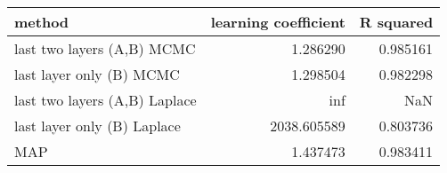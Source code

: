\begin{tabular}{lrr}
\toprule
                        method &  learning coefficient &  R squared \\
\midrule
    last two layers (A,B) MCMC &              1.286290 &   0.985161 \\
      last layer only (B) MCMC &              1.298504 &   0.982298 \\
 last two layers (A,B) Laplace &                   inf &        NaN \\
   last layer only (B) Laplace &           2038.605589 &   0.803736 \\
                           MAP &              1.437473 &   0.983411 \\
\bottomrule
\end{tabular}
